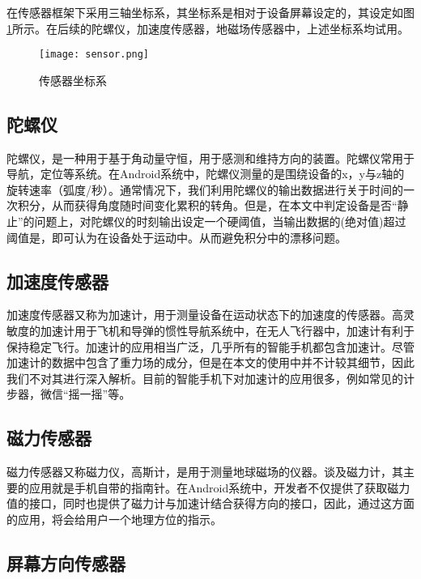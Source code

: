 \documentclass[winfonts]{njuthesis}
\begin{document}
		在传感器框架下采用三轴坐标系，其坐标系是相对于设备屏幕设定的，其设定如图\ref{fig: sensor}所示。在后续的陀螺仪，加速度传感器，地磁场传感器中，上述坐标系均试用。		
		
		\begin{figure}[H]
			\centering
			\texttt{[image: sensor.png]} 
			\caption{传感器坐标系}
			\label{fig: sensor}
		\end{figure}
		
			
		\subsection{陀螺仪}
		
		陀螺仪，是一种用于基于角动量守恒，用于感测和维持方向的装置。陀螺仪常用于导航，定位等系统。在Android系统中，陀螺仪测量的是围绕设备的x，y与z轴的旋转速率（弧度/秒）。通常情况下，我们利用陀螺仪的输出数据进行关于时间的一次积分，从而获得角度随时间变化累积的转角。但是，在本文中判定设备是否“静止”的问题上，对陀螺仪的时刻输出设定一个硬阈值，当输出数据的(绝对值)超过阈值是，即可认为在设备处于运动中。从而避免积分中的漂移问题。
			
		\subsection{加速度传感器}
		
		加速度传感器又称为加速计，用于测量设备在运动状态下的加速度的传感器。高灵敏度的加速计用于飞机和导弹的惯性导航系统中，在无人飞行器中，加速计有利于保持稳定飞行。加速计的应用相当广泛，几乎所有的智能手机都包含加速计。尽管加速计的数据中包含了重力场的成分，但是在本文的使用中并不计较其细节，因此我们不对其进行深入解析。目前的智能手机下对加速计的应用很多，例如常见的计步器，微信“摇一摇”等。
						
		\subsection{磁力传感器}
		
		磁力传感器又称磁力仪，高斯计，是用于测量地球磁场的仪器。谈及磁力计，其主要的应用就是手机自带的指南针。在Android系统中，开发者不仅提供了获取磁力值的接口，同时也提供了磁力计与加速计结合获得方向的接口，因此，通过这方面的应用，将会给用户一个地理方位的指示。
			
		\subsection{屏幕方向传感器}
		
\end{document}
